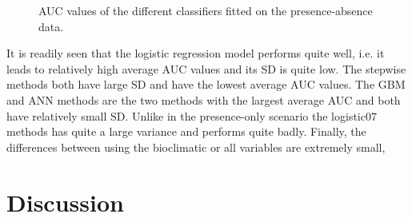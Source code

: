 \begin{figure}[!htb]
\center
{}
\caption{\label{fig:PrAbAUC}AUC values of the different classifiers fitted on the presence-absence data.}
\end{figure}

It is readily seen that the logistic regression model performs quite well, i.e. it leads to relatively high average AUC values and its SD is quite low. The stepwise methods both have large SD and have the lowest average AUC values. The GBM and ANN methods are the two methods with the largest average AUC and both have relatively small SD. Unlike in the presence-only scenario the logistic07 methods has quite a large variance and performs quite badly. Finally, the differences between using the bioclimatic or all variables are extremely small, 



\section{Discussion}

